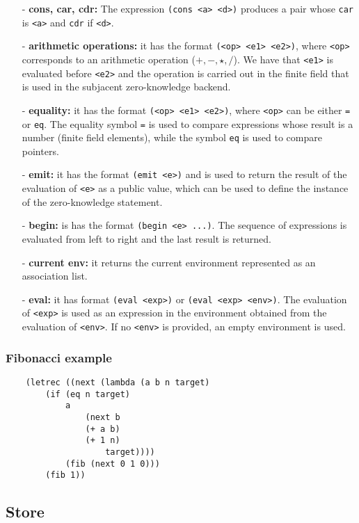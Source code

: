 \documentclass[10pt, english]{article}
\begin{document}
\begin{itemize}
  \item[-] \textbf{cons, car, cdr:} The expression \verb|(cons <a> <d>)| produces a pair whose \verb|car| is \verb|<a>| and \verb|cdr| if \verb|<d>|.
  \item[-] \textbf{arithmetic operations:} it has the format \verb|(<op> <e1> <e2>)|, where \verb|<op>| corresponds to an arithmetic operation ($+, -, \star, \slash$). We have that \verb|<e1>| is evaluated before \verb|<e2>| and the operation is carried out in the finite field that is used in the subjacent zero-knowledge backend.
  \item[-] \textbf{equality:} it has the format \verb|(<op> <e1> <e2>)|, where \verb|<op>| can be either \verb|=| or \verb|eq|. The equality symbol \verb|=| is used to compare expressions whose result is a number (finite field elements), while the symbol \verb|eq| is used to compare pointers.
  \item[-] \textbf{emit:} it has the format \verb|(emit <e>)| and is used to return the result of the evaluation of \verb|<e>| as a public value, which can be used to define the instance of the zero-knowledge statement.
  \item[-] \textbf{begin:} is has the format \verb|(begin <e> ...)|. The sequence of expressions is evaluated from left to right and the last result is returned.
  \item[-] \textbf{current env:} it returns the current environment represented as an association list.
  \item[-] \textbf{eval:} it has format \verb|(eval <exp>)| or \verb|(eval <exp> <env>)|. The evaluation of \verb|<exp>| is used as an expression in the environment obtained from the evaluation of \verb|<env>|. If no \verb|<env>| is provided, an empty environment is used.
\end{itemize}

\subsubsection{Fibonacci example}

\begin{verbatim}
    (letrec ((next (lambda (a b n target)
        (if (eq n target)
            a
                (next b
                (+ a b)
                (+ 1 n)
                    target))))
            (fib (next 0 1 0)))
        (fib 1))
\end{verbatim}

\subsection{Store}
\end{document}

